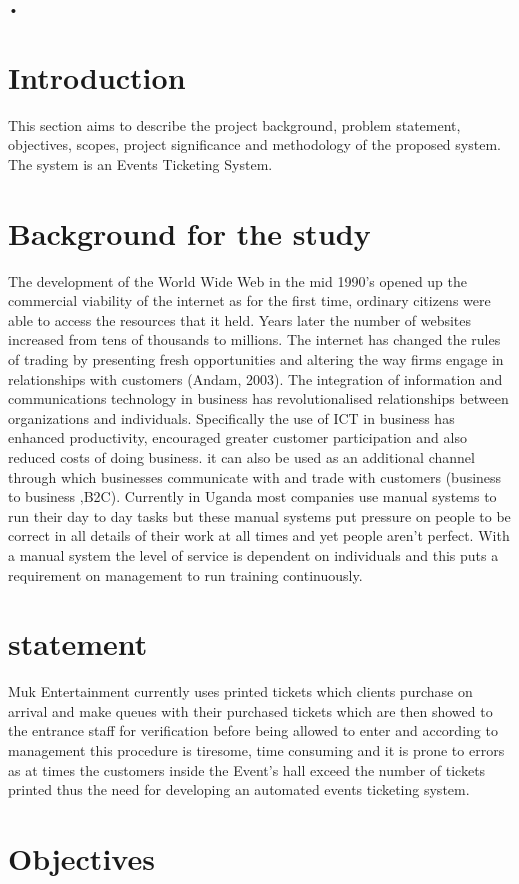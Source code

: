 \documentclass[10pt,a4paper]{report}
\begin{document}
•


\section{Introduction}
This section aims to describe the project background, problem statement, objectives, scopes, project significance and methodology of the proposed system. The system is an Events Ticketing System.
\section{Background for the study}
The development of the World Wide Web in the mid 1990’s opened up the commercial viability of the internet as for the first time, ordinary citizens were able to access the resources that it held. Years later the number of websites increased from tens of thousands to millions. The internet has changed the rules of trading by presenting fresh opportunities and altering the way firms engage in relationships with customers (Andam, 2003). The integration of information and communications technology in business has revolutionalised relationships between organizations and individuals. Specifically the use of ICT in business has enhanced productivity, encouraged greater customer participation and also reduced costs of doing business. it can also be used as an additional channel through which businesses communicate with and trade with customers (business to business ,B2C). 
Currently in Uganda most companies use manual systems to run their day to day tasks but these manual systems put pressure on people to be correct in all details of their work at all times and yet people aren’t perfect. With a manual system the level of service is dependent on individuals and this puts a requirement on management to run training continuously.
\section{statement}
Muk Entertainment currently uses printed tickets which clients purchase on arrival and make queues with their purchased tickets which are then showed to the entrance staff for verification before being allowed to enter and according to management this procedure is tiresome, time consuming and it is prone to errors as at times the customers inside the Event’s hall exceed the number of tickets printed thus the need for developing an automated events ticketing system.
\section{Objectives}
\end{document}
